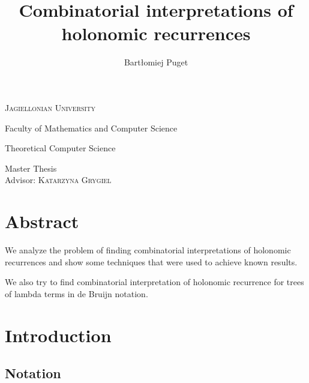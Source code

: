 \documentclass[final]{article}
\title{Combinatorial interpretations of holonomic recurrences}
\author{Bartłomiej Puget}
\theoremstyle{definition}
\theoremstyle{remark}
\begin{document}
\begin{titlepage}
	\begin{center}
	\textsc{\LARGE Jagiellonian University}

	\Large Faculty of Mathematics and Computer Science

	\Large Theoretical Computer Science

	\vfill

	\vspace{1cm}
	\hrulefill
	\vspace{0.5cm}

    \makeatletter
    \huge \textsc{\@title}
    \makeatother

	\vspace{0.2cm}
	\hrulefill

	\vspace{1cm}
    \makeatletter
	\textsc{\Large \@author}
    \makeatother

	\vspace{1cm}
    \normalsize

	Master Thesis\\
	Advisor: \textsc{Katarzyna Grygiel}

	\vfill

    \makeatletter
    \@date
    \makeatother
	\end{center}
\end{titlepage}

\section*{Abstract}%
\label{sec:abstract}

We analyze the problem of finding combinatorial interpretations of holonomic recurrences and show some techniques that were used to achieve known results.

We also try to find combinatorial interpretation of holonomic recurrence for trees of lambda terms in de Bruijn notation.

\clearpage

\tableofcontents
\clearpage

\section{Introduction}%
\label{sec:introduction}

\subsection{Notation}%
\label{sub:notation}
\end{document}
